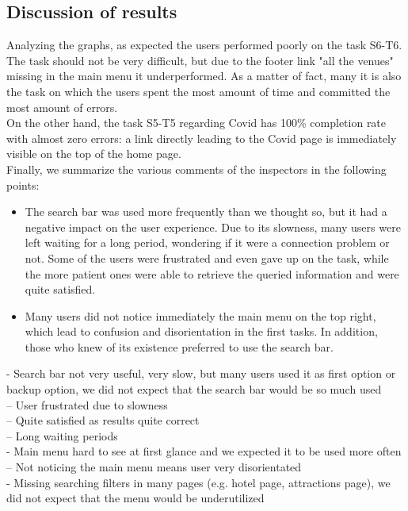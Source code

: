 \subsection{Discussion of results}
    Analyzing the graphs, as expected the users performed poorly on the task S6-T6. The task should not be very difficult, but due to the footer link "all the venues" missing in the main menu it underperformed. As a matter of fact, many it is also the task on which the users spent the most amount of time and committed the most amount of errors.\\
    On the other hand, the task S5-T5 regarding Covid has 100\% completion rate with almost zero errors: a link directly leading to the Covid page is immediately visible on the top of the home page.\\
    Finally, we summarize the various comments of the inspectors in the following points:
    \begin{itemize}
        \item The search bar was used more frequently than we thought so, but it had a negative impact on the user experience. Due to its slowness, many users were left waiting for a long period, wondering if it were a connection problem or not. Some of the users were frustrated and even gave up on the task, while the more patient ones were able to retrieve the queried information and were quite satisfied.
        \item Many users did not notice immediately the main menu on the top right, which lead to confusion and disorientation in the first tasks. In addition, those who knew of its existence preferred to use the search bar.
    \end{itemize}
    - Search bar not very useful, very slow, but many users used it as first option or backup option, we did not expect that the search bar would be so much used\\
        -- User frustrated due to slowness\\
        -- Quite satisfied as results quite correct\\
        -- Long waiting periods\\
    - Main menu hard to see at first glance and we expected it to be used more often\\
        -- Not noticing the main menu means user very disorientated\\
    - Missing searching filters in many pages (e.g. hotel page, attractions page), we did not expect that the menu would be underutilized\\
